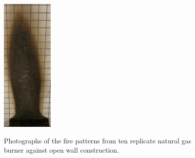 \documentclass[twoside]{uocthesis}
\begin{document}
{\begin{figure}[p]
	\includegraphics[width=1.0in]{../Figures/GBNG13_P5120356} \\

	\caption[Photographs of the fire patterns from ten replicate natural gas burner against open wall construction]{Photographs of the fire patterns from ten replicate natural gas burner against open wall construction.}
	\label{NG_Open_Wall}
\end{figure}


}
\end{document}

